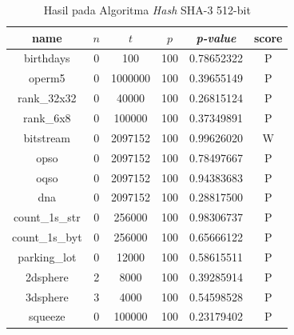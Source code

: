 \documentclass[conference]{IEEEtran}
\newcommand{\en}[1]
    {\foreignlanguage{english}{\textit{#1}}}
\begin{document}
\begin{table}[htbp]
    \caption{Hasil  pada Algoritma \en{Hash} SHA-3 512-bit}
    \label{tab:analisis:res-sha3-512}
    \begin{center}
        \begin{tabular}{|c|c|c|c|c|c|}
            \hline
            \textbf{name}  & \textbf{$n$} & \textbf{$t$} & \textbf{$p$} & \textbf{\en{p-value}} & \textbf{score} \\
            \hline
            birthdays      & 0            & 100          & 100          & 0.78652322            & P              \\
            operm5         & 0            & 1000000      & 100          & 0.39655149            & P              \\
            rank\_32x32    & 0            & 40000        & 100          & 0.26815124            & P              \\
            rank\_6x8      & 0            & 100000       & 100          & 0.37349891            & P              \\
            bitstream      & 0            & 2097152      & 100          & 0.99626020            & W              \\
            opso           & 0            & 2097152      & 100          & 0.78497667            & P              \\
            oqso           & 0            & 2097152      & 100          & 0.94383683            & P              \\
            dna            & 0            & 2097152      & 100          & 0.28817500            & P              \\
            count\_1s\_str & 0            & 256000       & 100          & 0.98306737            & P              \\
            count\_1s\_byt & 0            & 256000       & 100          & 0.65666122            & P              \\
            parking\_lot   & 0            & 12000        & 100          & 0.58615511            & P              \\
            2dsphere       & 2            & 8000         & 100          & 0.39285914            & P              \\
            3dsphere       & 3            & 4000         & 100          & 0.54598528            & P              \\
            squeeze        & 0            & 100000       & 100          & 0.23179402            & P              \\

\end{tabular}
\end{center}
\end{table}
\end{document}
